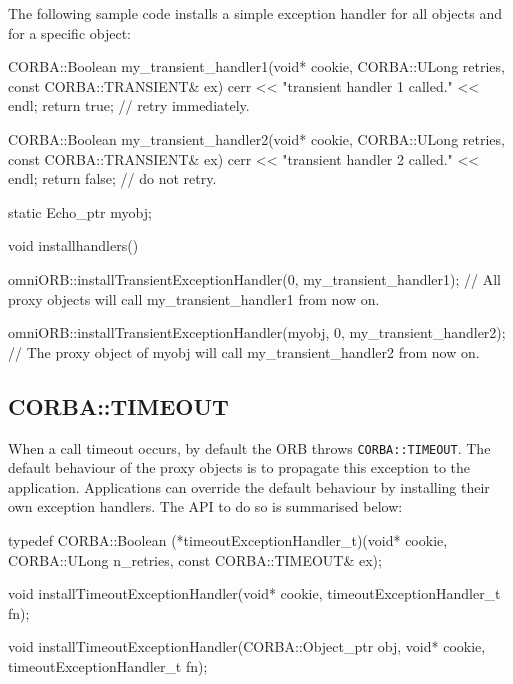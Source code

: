 \documentclass[11pt,twoside,a4paper]{book}
\newcommand{\code}[1]{\texttt{#1}}
\begin{document}
The following sample code installs a simple exception handler for all
objects and for a specific object:

\begin{cxxlisting}
CORBA::Boolean my_transient_handler1(void* cookie,
                                     CORBA::ULong retries,
                                     const CORBA::TRANSIENT& ex)
{
   cerr << "transient handler 1 called." << endl;
   return true;           // retry immediately.
}
 
CORBA::Boolean my_transient_handler2(void* cookie,
                                     CORBA::ULong retries,
                                     const CORBA::TRANSIENT& ex)
{
   cerr << "transient handler 2 called." << endl;
   return false;          // do not retry.
}


static Echo_ptr myobj;

void installhandlers()
{
   omniORB::installTransientExceptionHandler(0, my_transient_handler1);
   // All proxy objects will call my_transient_handler1 from now on.

   omniORB::installTransientExceptionHandler(myobj, 0, my_transient_handler2);
   // The proxy object of myobj will call my_transient_handler2 from now on.
}
\end{cxxlisting}


\subsection{CORBA::TIMEOUT}

When a call timeout occurs, by default the ORB throws
\code{CORBA::TIMEOUT}. The default behaviour of the proxy objects is
to propagate this exception to the application. Applications can
override the default behaviour by installing their own exception
handlers. The API to do so is summarised below:

\begin{cxxlisting}
typedef CORBA::Boolean
(*timeoutExceptionHandler_t)(void* cookie,
                             CORBA::ULong n_retries,
                             const CORBA::TIMEOUT& ex);

void
installTimeoutExceptionHandler(void* cookie,
                               timeoutExceptionHandler_t fn);

void
installTimeoutExceptionHandler(CORBA::Object_ptr obj,
                               void* cookie,
                               timeoutExceptionHandler_t fn);
\end{cxxlisting}
\end{document}
